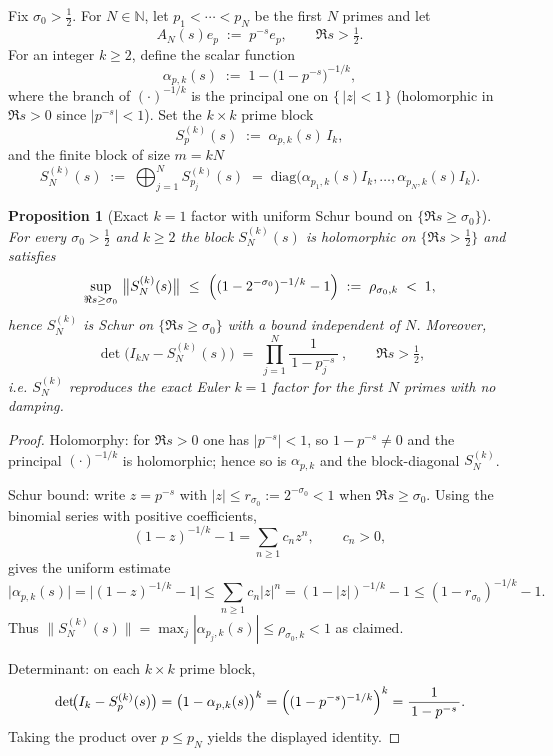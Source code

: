 \documentclass[11pt]{article}
\newtheorem{proposition}[theorem]{Proposition}
\theoremstyle{remark}
\begin{document}
Fix $\sigma_0>\tfrac12$. For $N\in\mathbb N$, let $p_1<\cdots<p_N$ be the first $N$ primes and let
\[
 A_N(s)e_p\;:=\;p^{-s}e_p,\qquad \Re s>\tfrac12.
\]
For an integer $k\ge 2$, define the scalar function
\[
 \alpha_{p,k}(s)\;:=\;1-\bigl(1-p^{-s}\bigr)^{-1/k},
\]
where the branch of $(\cdot)^{-1/k}$ is the principal one on $\{\,|z|<1\,\}$ (holomorphic in $\Re s>0$ since $|p^{-s}|<1$). Set the $k\times k$ prime block
\[
 S_p^{(k)}(s)\;:=\;\alpha_{p,k}(s)\,I_k,
\]
and the finite block of size $m=kN$
\[
 \boxed{\quad S_{N}^{(k)}(s)\;:=\;\bigoplus_{j=1}^{N} S_{p_j}^{(k)}(s)\;=\;\mathrm{diag}\bigl(\alpha_{p_1,k}(s)I_k,\dots,\alpha_{p_N,k}(s)I_k\bigr).\quad}
\]

\begin{proposition}[Exact $k=1$ factor with uniform Schur bound on $\{\Re s\ge \sigma_0\}$]
\label{prop:kfold}
For every $\sigma_0>\tfrac12$ and $k\ge 2$ the block $S_{N}^{(k)}(s)$ is holomorphic on $\{\Re s>\tfrac12\}$ and satisfies
\[
 \sup_{\Re s\ge \sigma_0}\ \bigl\|S_{N}^{(k)}(s)\bigr\|\ \le\ \Bigl((1-2^{-\sigma_0})^{-1/k}-1\Bigr)\;:=\;\rho_{\sigma_0,k}\;<\;1,
\]
hence $S_{N}^{(k)}$ is Schur on $\{\Re s\ge \sigma_0\}$ with a bound independent of $N$. Moreover,
\[
 \boxed{\ \det\!\bigl(I_{kN}-S_{N}^{(k)}(s)\bigr)\;=\;\prod_{j=1}^{N}\frac{1}{\,1-p_j^{-s}\,}\ },\qquad \Re s>\tfrac12,
\]
i.e. $S_{N}^{(k)}$ reproduces the exact Euler $k=1$ factor for the first $N$ primes with no damping.
\end{proposition}

\begin{proof}
Holomorphy: for $\Re s>0$ one has $|p^{-s}|<1$, so $1-p^{-s}\neq 0$ and the principal $(\cdot)^{-1/k}$ is holomorphic; hence so is $\alpha_{p,k}$ and the block-diagonal $S_{N}^{(k)}$.

Schur bound: write $z=p^{-s}$ with $|z|\le r_{\sigma_0}:=2^{-\sigma_0}<1$ when $\Re s\ge \sigma_0$. Using the binomial series with positive coefficients,
\[
 (1-z)^{-1/k}-1=\sum_{n\ge 1} c_n z^n,\qquad c_n>0,
\]
gives the uniform estimate
\[
 \bigl|\alpha_{p,k}(s)\bigr|=\bigl|(1-z)^{-1/k}-1\bigr|\le \sum_{n\ge 1} c_n |z|^n
= (1-|z|)^{-1/k}-1 \le (1-r_{\sigma_0})^{-1/k}-1.
\]
Thus $\|S_{N}^{(k)}(s)\|=\max_{j}|\alpha_{p_j,k}(s)|\le \rho_{\sigma_0,k}<1$ as claimed.

Determinant: on each $k\times k$ prime block,
\[
 \det\!\bigl(I_k-S_{p}^{(k)}(s)\bigr)=\bigl(1-\alpha_{p,k}(s)\bigr)^{k}=\Bigl((1-p^{-s})^{-1/k}\Bigr)^{k}=\frac{1}{\,1-p^{-s}\,}.
\]
Taking the product over $p\le p_N$ yields the displayed identity.
\end{proof}
\end{document}
